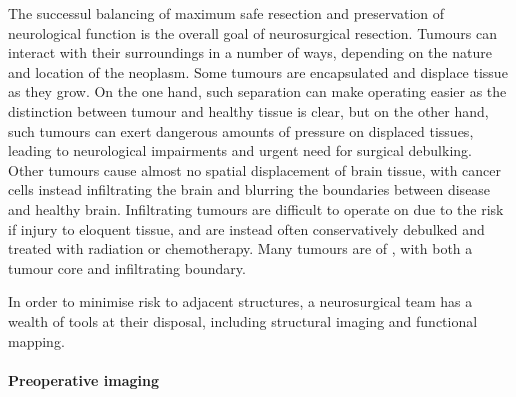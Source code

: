 The successul balancing of maximum safe resection and preservation of neurological function is the overall goal of neurosurgical resection.
Tumours can interact with their surroundings in a number of ways, depending on the nature and location of the neoplasm.
Some tumours are encapsulated and displace tissue as they grow.
On the one hand, such separation can make operating easier as the distinction between tumour and healthy tissue is clear, but on the other hand, such tumours can exert dangerous amounts of pressure on displaced tissues, leading to neurological impairments and urgent need for surgical debulking.
Other tumours cause almost no spatial displacement of brain tissue, with cancer cells instead infiltrating the brain and blurring the boundaries between disease and healthy brain.
Infiltrating tumours are difficult to operate on due to the risk if injury to eloquent tissue, and are instead often conservatively debulked and treated with radiation or chemotherapy.
Many tumours are of , with both a tumour core and infiltrating boundary.

In order to minimise risk to adjacent structures, a neurosurgical team has a wealth of tools at their disposal, including structural imaging and functional mapping.

\paragraph*{Preoperative imaging}

